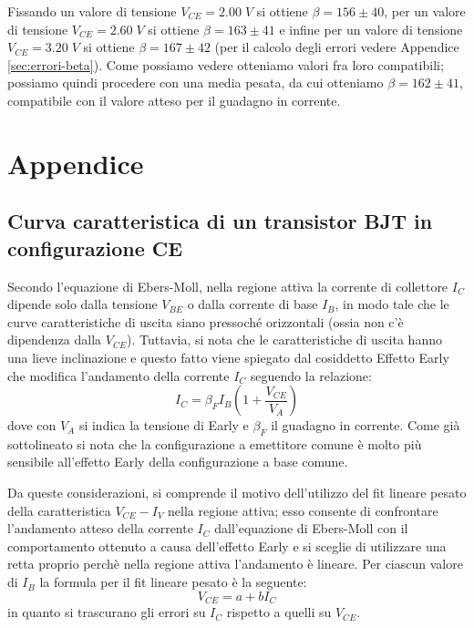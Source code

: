 \documentclass[a4paper, 11pt]{article}
\begin{document}
Fissando un valore di tensione $V_{CE} = 2.00 \; V$ si ottiene $\beta = 156 \pm 40$, per un valore di tensione $V_{CE} = 2.60 \; V$ si ottiene $\beta = 163 \pm 41$ e infine per un valore di tensione $V_{CE} = 3.20 \; V$ si ottiene $\beta = 167 \pm 42$ (per il calcolo degli errori vedere Appendice \ref{sec:errori-beta}). Come possiamo vedere otteniamo valori fra loro compatibili; possiamo quindi procedere con una media pesata, da cui otteniamo $\beta = 162 \pm 41$, compatibile con il valore atteso per il guadagno in corrente. 

\section{Appendice}

\subsection{Curva caratteristica di un transistor BJT in configurazione CE} \label{sec:curva-caratteristica-transistor}
Secondo l'equazione di Ebers-Moll, nella regione attiva la corrente di collettore $I_C$ dipende solo dalla tensione $V_{BE}$ o dalla corrente di base $I_B$, in modo tale che le curve caratteristiche di uscita siano pressoché orizzontali (ossia non c'è dipendenza dalla $V_{CE}$). Tuttavia, si nota che le caratteristiche di uscita hanno una lieve inclinazione e questo fatto viene spiegato dal cosiddetto Effetto Early che modifica l'andamento della corrente $I_C$ seguendo la relazione:
\begin{equation}
    I_C = \beta_F I_B (1 + \frac{V_{CE}}{V_A})
\end{equation}
dove con $V_A$ si indica la tensione di Early e $\beta_F$ il guadagno in corrente. Come già sottolineato si nota che la configurazione a emettitore comune è molto più sensibile all’effetto Early della configurazione a base comune.

Da queste considerazioni, si comprende il motivo dell'utilizzo del fit lineare pesato della caratteristica $V_{CE}-I_V$ nella regione attiva; esso consente di confrontare l'andamento atteso della corrente $I_C$ dall'equazione di Ebers-Moll con il comportamento ottenuto a causa dell'effetto Early e si sceglie di utilizzare una retta proprio perchè nella regione attiva l'andamento è lineare. 
Per ciascun valore di $I_B$ la formula per il fit lineare pesato è la seguente:
\begin{equation} \label{eq:caratteristica I-V}
    V_{CE} = a + bI_C
\end{equation}
in quanto si trascurano gli errori su $I_C$ rispetto a quelli su $V_{CE}$.
\end{document}
